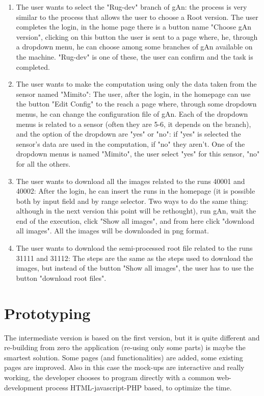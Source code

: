 \begin{enumerate}
\item The user wants to select the "Rug-dev" branch of gAn:
the process is very similar to the process that allows the user to choose a Root version. The user completes the login, in the home page there is a button name "Choose gAn version", clicking on this button the user is sent to a page where, he, through a dropdown menu, he can choose among some branches of gAn available on the machine. "Rug-dev" is one of these, the user can confirm and the task is completed.

\item The user wants to make the computation using only the data taken from the sensor named "Mimito":
The user, after the login, in the homepage can use the button "Edit Config" to the reach a page where, through some dropdown menus, he can change the configuration file of gAn. Each of the dropdown menus is related to a sensor (often they are 5-6, it depends on the branch), and the option of the dropdown are "yes" or "no": if "yes" is selected the sensor's data are used in the computation, if "no" they aren't. One of the dropdown menus is named "Mimito", the user select "yes" for this sensor, "no" for all the others.  

\item The user wants to download all the images related to the runs 40001 and 40002:
After the login, he can insert the runs in the homepage (it is possible both by input field and by range selector. Two ways to do the same thing: although in the next version this point will be rethought), run gAn, wait the end of the execution, click "Show all images", and from here click "download all images". All the images will be downloaded in png format.

\item The user wants to download the semi-processed root file related to the runs 31111 and 31112:
The steps are the same as the steps used to download the images, but instead of the button "Show all images", the user has to use the button "download root files".     

\end{enumerate}  


\section{Prototyping}

The intermediate version is based on the first version, but it is quite different and re-building from zero the application (re-using only some parts) is maybe the smartest solution. Some pages (and functionalities) are added, some existing pages are improved. 
Also in this case the mock-ups are interactive and really working, the developer chooses to program directly with a common web-development process HTML-javascript-PHP based, to optimize the time.

